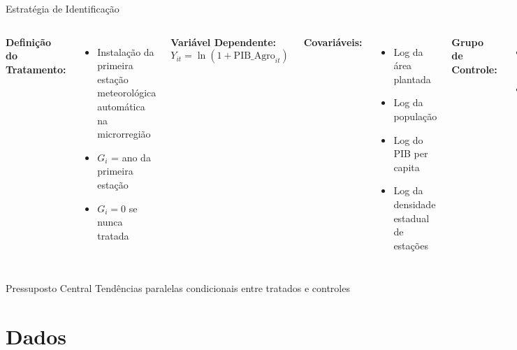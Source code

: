 \documentclass[10pt,aspectratio=169]{beamer}
\begin{document}
\begin{frame}{Estratégia de Identificação}
\begin{columns}
\textbf{Definição do Tratamento:}
\begin{itemize}
    \item Instalação da primeira estação meteorológica automática na microrregião
    \item $G_i$ = ano da primeira estação
    \item $G_i = 0$ se nunca tratada
\end{itemize}

\textbf{Variável Dependente:}
$$Y_{it} = \ln(1 + \text{PIB\_Agro}_{it})$$

\textbf{Covariáveis:}
\begin{itemize}
    \item Log da área plantada
    \item Log da população
    \item Log do PIB per capita
    \item Log da densidade estadual de estações
\end{itemize}

\textbf{Grupo de Controle:}
\begin{itemize}
    \item "Not-yet-treated"
    \item Maximiza eficiência estatística
\end{itemize}
\end{columns}

\begin{block}{Pressuposto Central}
Tendências paralelas condicionais entre tratados e controles
\end{block}
\end{frame}

\section{Dados}
\end{document}
